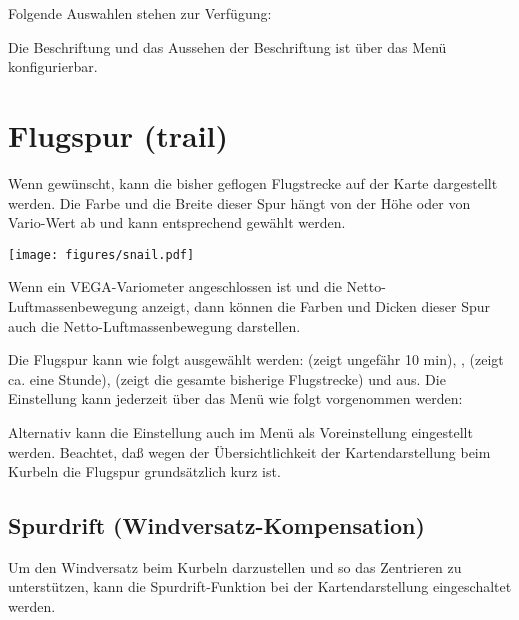Folgende Auswahlen stehen zur Verfügung:


Die Beschriftung und das Aussehen der Beschriftung ist über das Menü  konfigurierbar.
\section{Flugspur (trail)}\label{sec:trail}

Wenn gewünscht, kann die bisher geflogen Flugstrecke auf der Karte dargestellt werden. Die Farbe und die Breite dieser Spur hängt von der Höhe oder von Vario-Wert ab und kann entsprechend gewählt werden. 

\begin{center}
\texttt{[image: figures/snail.pdf]}
\end{center}

Wenn ein VEGA-Variometer angeschlossen ist und die Netto-Luftmassenbewegung anzeigt, dann können die Farben und Dicken dieser Spur auch die Netto-Luftmassenbewegung darstellen.

Die Flugspur kann wie folgt ausgewählt werden:  (zeigt ungefähr 10 min),  , (zeigt ca. eine Stunde),  (zeigt die gesamte bisherige Flugstrecke) und aus. Die Einstellung kann jederzeit über das Menü wie folgt vorgenommen werden:


Alternativ kann die Einstellung auch im Menü   als Voreinstellung eingestellt werden.
Beachtet, daß wegen der Übersichtlichkeit der Kartendarstellung beim Kurbeln die Flugspur grundsätzlich kurz ist.
\subsection*{Spurdrift (Windversatz-Kompensation)}
Um den Windversatz beim Kurbeln darzustellen und so das Zentrieren zu unterstützen, kann die Spurdrift-Funktion bei der Kartendarstellung eingeschaltet werden.

